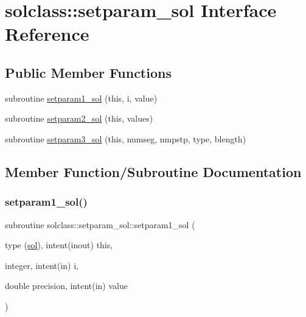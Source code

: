\hypertarget{interfacesolclass_1_1setparam__sol}{}\section{solclass\+::setparam\+\_\+sol Interface Reference}
\label{interfacesolclass_1_1setparam__sol}
\subsection*{Public Member Functions}
\begin{DoxyCompactItemize}
\item 
subroutine \mbox{\hyperlink{interfacesolclass_1_1setparam__sol_a6d7f4ad1ea0a70d9785e5dda3d5ff743}{setparam1\+\_\+sol}} (this, i, value)
\item 
subroutine \mbox{\hyperlink{interfacesolclass_1_1setparam__sol_a0ca3b6bae895dd059d3170e25aaf4dd6}{setparam2\+\_\+sol}} (this, values)
\item 
subroutine \mbox{\hyperlink{interfacesolclass_1_1setparam__sol_a6cd6341dc6fd8b5597bd302a1eef4590}{setparam3\+\_\+sol}} (this, numseg, nmpstp, type, blength)
\end{DoxyCompactItemize}


\subsection{Member Function/\+Subroutine Documentation}
\mbox{\label{interfacesolclass_1_1setparam__sol_a6d7f4ad1ea0a70d9785e5dda3d5ff743}} 
\subsubsection{\texorpdfstring{setparam1\_sol()}{setparam1\_sol()}}
{\footnotesize\ttfamily subroutine solclass\+::setparam\+\_\+sol\+::setparam1\+\_\+sol (\begin{DoxyParamCaption}\item[{type (\mbox{\hyperlink{namespacesolclass_structsolclass_1_1sol}{sol}}), intent(inout)}]{this,  }\item[{integer, intent(in)}]{i,  }\item[{double precision, intent(in)}]{value }\end{DoxyParamCaption})}

